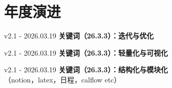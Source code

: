 \documentclass[11pt, a4paper, oneside]{book}
\begin{document}
\part{年度演进}
\begin{sum1}{v2.1 - 2026.03.19}
\Large\textbf{关键词（26.3.3）：迭代与优化}
\end{sum1}

\begin{sum2}{v2.1 - 2026.03.19}
\Large\textbf{关键词（26.3.3）：轻量化与可视化}

\end{sum2}

\begin{sum3}{v2.1 - 2026.03.19}
\Large\textbf{关键词（26.3.3）：结构化与模块化}\\
（notion，latex，日程，calflow etc）
\end{sum3}
\end{document}
